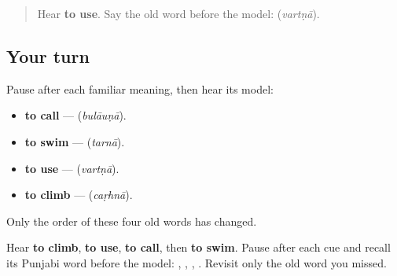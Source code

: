 \label{lesson:PA-R161-use-again}



\begin{quote}
Hear \textbf{to use}. Say the old word before the model: \textbf{} (\emph{vartṇā}).
\end{quote}

\subsection*{Your turn}
Pause after each familiar meaning, then hear its model:

\begin{itemize}
\raggedright
  \item \textbf{to call} — \textbf{} (\emph{bulāuṇā}).
  \item \textbf{to swim} — \textbf{} (\emph{tarnā}).
  \item \textbf{to use} — \textbf{} (\emph{vartṇā}).
  \item \textbf{to climb} — \textbf{} (\emph{caṛhnā}).
\end{itemize}

Only the order of these four old words has changed.

\begin{tcolorbox}[breakable,colback=teal!4,colframe=teal!35!black,title={Before you move on}]
Hear \textbf{to climb}, \textbf{to use}, \textbf{to call}, then \textbf{to swim}. Pause after each cue and recall its Punjabi word before the model: \textbf{}, \textbf{}, \textbf{}, \textbf{}. Revisit only the old word you missed.
\end{tcolorbox}
